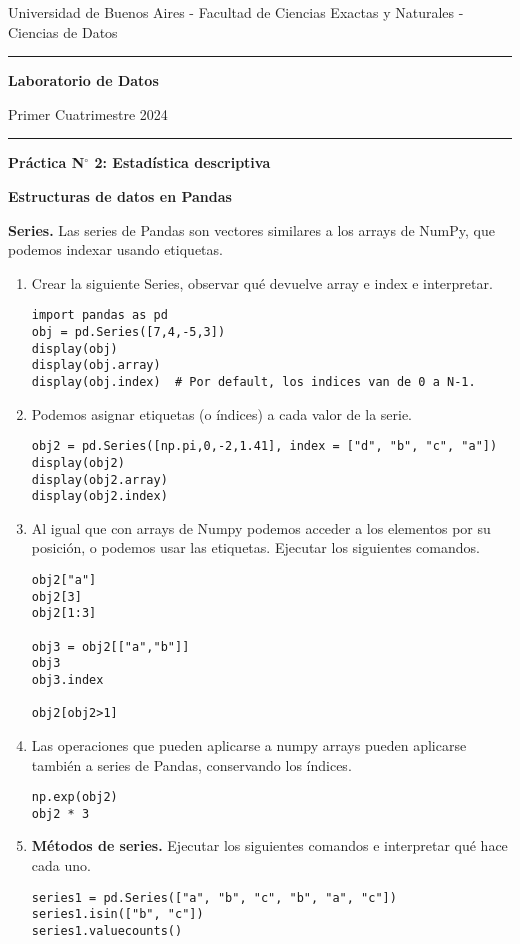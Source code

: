 \documentclass[a4paper,11pt]{article}
\theoremstyle{definition}
\begin{document}
\centerline{{\small Universidad de Buenos Aires - Facultad de Ciencias Exactas y Naturales - Ciencias de Datos}}

\vskip 0.2cm

\hrule

\vskip 0.2cm

 \centerline{{\bf\Large{\sc Laboratorio de Datos}}}

 \vskip 0.2cm

 \centerline{\ttfamily Primer Cuatrimestre 2024}

\vskip 0.2cm

 \hrule

 \bigskip
 \centerline{\bf Práctica N$^\circ$ 2: Estad\'istica descriptiva}
 \bigskip


\textbf{\large Estructuras de datos en Pandas}

\vspace{0.2cm}

\textbf{Series.} Las series de Pandas son vectores similares a los arrays de NumPy, que podemos indexar usando etiquetas.

\begin{enumerate}
\item Crear la siguiente Series, observar qué devuelve array e index e interpretar.

\begin{lstlisting}
import pandas as pd
obj = pd.Series([7,4,-5,3])
display(obj)
display(obj.array)
display(obj.index)  # Por default, los indices van de 0 a N-1.
\end{lstlisting}

\item Podemos asignar etiquetas (o \'indices) a cada valor de la serie.
\begin{lstlisting}
obj2 = pd.Series([np.pi,0,-2,1.41], index = ["d", "b", "c", "a"])
display(obj2)
display(obj2.array)
display(obj2.index)
\end{lstlisting}

\item Al igual que con arrays de Numpy podemos acceder a los elementos por su posici\'on, o podemos usar las etiquetas. Ejecutar los siguientes comandos.
\begin{lstlisting}
obj2["a"]
obj2[3]
obj2[1:3]

obj3 = obj2[["a","b"]]
obj3
obj3.index

obj2[obj2>1]
\end{lstlisting}

\item Las operaciones que pueden aplicarse a numpy arrays pueden aplicarse tambi\'en a series de Pandas, conservando los \'indices.
\begin{lstlisting}
np.exp(obj2)
obj2 * 3
\end{lstlisting}

\item \textbf{M\'etodos de series.} Ejecutar los siguientes comandos e interpretar qu\'e hace cada uno.
\begin{lstlisting}
series1 = pd.Series(["a", "b", "c", "b", "a", "c"])
series1.isin(["b", "c"])
series1.valuecounts()
\end{lstlisting}

\end{enumerate}
\end{document}
